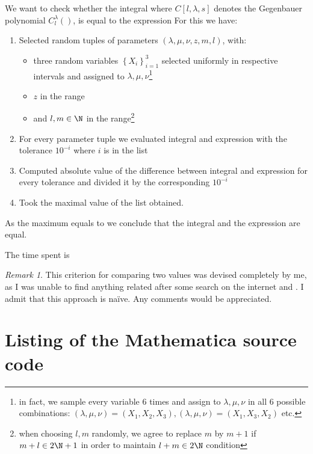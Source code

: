 \documentclass[12pt,a4paper]{article}
\theoremstyle{remark}
\newtheorem{remark}{Remark}
\begin{document}
We want to check whether the integral
where $C[l,\lambda,s]$ denotes the Gegenbauer polynomial $C^\lambda_l()$,
is equal to the expression
For this we have:
\begin{enumerate}
	\item 
Selected 
random tuples of parameters $(\lambda,\mu,\nu,z,m,l)$, with:\begin{itemize}
	\item 
		three random variables $\left\{ X_i \right\}_{i=1}^3$ selected uniformly in respective intervals
		and assigned to $\lambda,\mu,\nu$\footnote{in fact, we sample every variable 6 times and assign to $\lambda,\mu,\nu$ in all 6 possible combinations:
		$(\lambda,\mu,\nu)=\left( X_1,X_2,X_3 \right),\left( \lambda,\mu,\nu \right)=\left( X_1,X_3,X_2 \right)$ etc.}
	\item
$z$ in the range
	\item
and $l,m\in\N$ in the range\footnote{when choosing $l,m$ randomly, we agree to replace $m$ by $m+1$ if $m+l\in2\N+1$ in order to maintain $l+m\in2\N$ condition}

\end{itemize}
\item For every parameter tuple we evaluated integral and expression with the tolerance $10^{-i}$ where $i$ is in the list
\item Computed absolute value of the difference between integral and expression for every tolerance and divided it by the corresponding $10^{-i}$
\item Took the maximal value of the list obtained.
\end{enumerate}
As the maximum equals to
we conclude that the integral and the expression are equal.

The time spent is
\begin{center}
	
\end{center}
\begin{remark}
	This criterion for comparing two values was devised completely by me, as I was unable to find anything related after some search on the internet and \cite{teukolsky1992numerical}.
	I admit that this approach is na\"ive. Any comments would be appreciated.
\end{remark}
	\appendix
	\section{Listing of the Mathematica source code}
	
	
	
\end{document}
